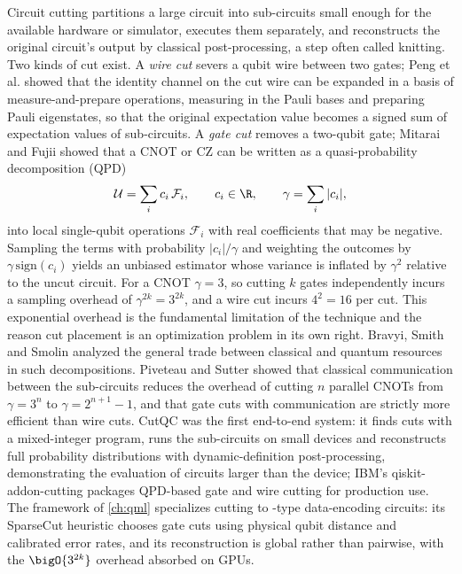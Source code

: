 Circuit cutting partitions a large circuit into sub-circuits small enough for the available hardware or simulator, executes them separately, and reconstructs the original circuit's output by classical post-processing, a step often called knitting. Two kinds of cut exist. A \emph{wire cut} severs a qubit wire between two gates; Peng et al. \cite{peng2020circuitcutting} showed that the identity channel on the cut wire can be expanded in a basis of measure-and-prepare operations, measuring in the Pauli bases and preparing Pauli eigenstates, so that the original expectation value becomes a signed sum of expectation values of sub-circuits. A \emph{gate cut} removes a two-qubit gate; Mitarai and Fujii \cite{mitarai2021virtualgate} showed that a CNOT or CZ can be written as a quasi-probability decomposition (QPD)
\begin{equation}\label{eq:bg:qpd}
\mathcal{U}=\sum_{i}c_i\,\mathcal{F}_i,\qquad c_i\in\R,\qquad \gamma=\sum_{i}|c_i|,
\end{equation}
into local single-qubit operations $\mathcal{F}_i$ with real coefficients that may be negative. Sampling the terms with probability $|c_i|/\gamma$ and weighting the outcomes by $\gamma\,\mathrm{sign}(c_i)$ yields an unbiased estimator whose variance is inflated by $\gamma^2$ relative to the uncut circuit. For a CNOT $\gamma=3$, so cutting $k$ gates independently incurs a sampling overhead of $\gamma^{2k}=3^{2k}$, and a wire cut incurs $4^2=16$ per cut. This exponential overhead is the fundamental limitation of the technique and the reason cut placement is an optimization problem in its own right. Bravyi, Smith and Smolin \cite{bravyi2016trading} analyzed the general trade between classical and quantum resources in such decompositions. Piveteau and Sutter \cite{piveteau2024knitting} showed that classical communication between the sub-circuits reduces the overhead of cutting $n$ parallel CNOTs from $\gamma=3^{n}$ to $\gamma=2^{n+1}-1$, and that gate cuts with communication are strictly more efficient than wire cuts. CutQC \cite{tang2021cutqc} was the first end-to-end system: it finds cuts with a mixed-integer program, runs the sub-circuits on small devices and reconstructs full probability distributions with dynamic-definition post-processing, demonstrating the evaluation of circuits larger than the device; IBM's qiskit-addon-cutting packages QPD-based gate and wire cutting for production use. The \shardq{} framework of \cref{ch:qml} \cite{guo2025shardq} specializes cutting to \qcrank{}-type data-encoding circuits: its SparseCut heuristic chooses gate cuts using physical qubit distance and calibrated error rates, and its reconstruction is global rather than pairwise, with the $\bigO{3^{2k}}$ overhead absorbed on GPUs.

